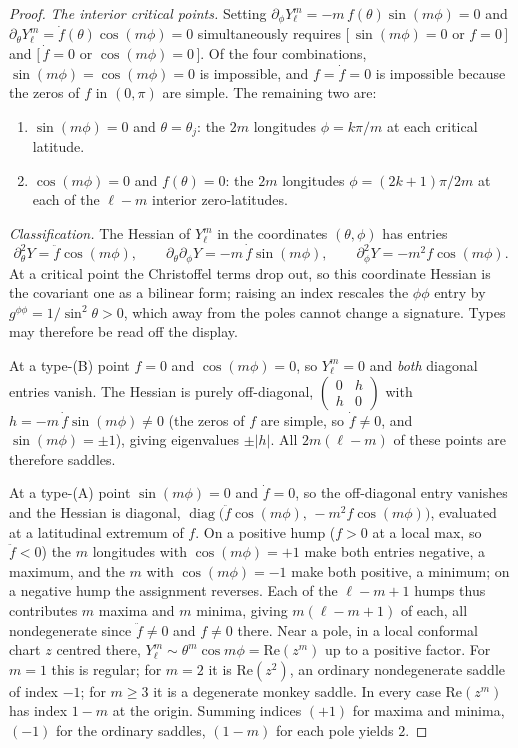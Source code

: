 \documentclass[11pt,a4paper]{article}
\theoremstyle{definition}
\begin{document}
\begin{proof}
\emph{The interior critical points.} Setting $\partial_\phi Y_\ell^m=-m\,f(\theta)\sin(m\phi)=0$ and
$\partial_\theta Y_\ell^m=\dot f(\theta)\cos(m\phi)=0$ simultaneously requires
$[\,\sin(m\phi)=0$ or $f=0\,]$ and $[\,\dot f=0$ or $\cos(m\phi)=0\,]$. Of the four combinations, $\sin(m\phi)=
\cos(m\phi)=0$ is impossible, and $f=\dot f=0$ is impossible because the zeros of $f$ in $(0,\pi)$ are simple.
The remaining two are:
\begin{enumerate}[nosep]
\item[(A)] $\sin(m\phi)=0$ and $\theta=\theta_j$: the $2m$ longitudes $\phi=k\pi/m$ at each critical latitude.
\item[(B)] $\cos(m\phi)=0$ and $f(\theta)=0$: the $2m$ longitudes $\phi=(2k{+}1)\pi/2m$ at each of
the $\ell-m$ interior zero-latitudes.
\end{enumerate}
\emph{Classification.} The Hessian of $Y_\ell^m$ in the coordinates $(\theta,\phi)$ has entries
\[
\partial_\theta^2 Y=\ddot f\cos(m\phi), \qquad
\partial_\theta\partial_\phi Y=-m\,\dot f\sin(m\phi), \qquad
\partial_\phi^2 Y=-m^2 f\cos(m\phi).
\]
At a critical point the Christoffel terms drop out, so this coordinate Hessian is the covariant one as a
bilinear form; raising an index rescales the $\phi\phi$ entry by $g^{\phi\phi}=1/\sin^2\theta>0$, which away
from the poles cannot change a signature. Types may therefore be read off the display.

At a type-(B) point $f=0$ and $\cos(m\phi)=0$, so $Y_\ell^m=0$ and \emph{both} diagonal entries vanish. The
Hessian is purely off-diagonal, $\left(\begin{smallmatrix}0&h\\h&0\end{smallmatrix}\right)$ with
$h=-m\,\dot f\sin(m\phi)\ne0$ (the zeros of $f$ are simple, so $\dot f\ne0$, and $\sin(m\phi)=\pm1$), giving
eigenvalues $\pm\lvert h\rvert$. All $2m(\ell-m)$ of these points are therefore saddles.

At a type-(A) point $\sin(m\phi)=0$ and $\dot f=0$, so the off-diagonal entry vanishes and the Hessian is
diagonal, $\operatorname{diag}\big(\ddot f\cos(m\phi),\,-m^2 f\cos(m\phi)\big)$, evaluated at a latitudinal
extremum of $f$. On a positive hump ($f>0$ at a local max, so $\ddot f<0$) the $m$ longitudes with
$\cos(m\phi)=+1$ make both entries negative, a maximum, and the $m$ with $\cos(m\phi)=-1$ make both positive, a
minimum; on a negative hump the assignment reverses. Each of the $\ell-m+1$ humps thus contributes $m$ maxima
and $m$ minima, giving $m(\ell-m+1)$ of each, all nondegenerate since $\ddot f\ne0$ and $f\ne0$ there. Near a pole, in a local conformal chart $z$ centred there, $Y_\ell^m\sim\theta^m\cos m\phi=\mathrm{Re}(z^m)$
up to a positive factor. For $m=1$ this is regular; for $m=2$ it is $\mathrm{Re}(z^2)$, an ordinary
nondegenerate saddle of index $-1$; for $m\ge3$ it is a degenerate monkey saddle. In every case
$\mathrm{Re}(z^m)$ has index $1-m$ at the origin. Summing indices $(+1)$ for maxima and minima, $(-1)$ for the
ordinary saddles, $(1-m)$ for each pole yields $2$.
\end{proof}
\end{document}
